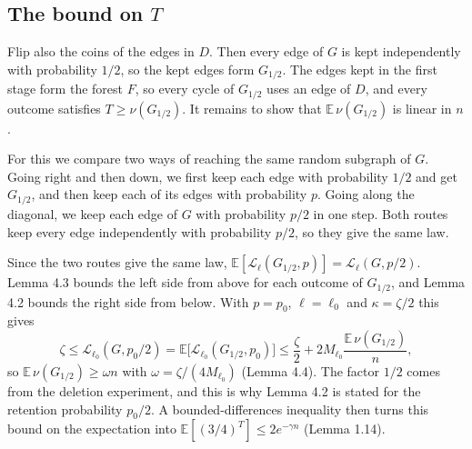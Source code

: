﻿\documentclass[10pt,a4paper]{article}
\newcommand{\E}{\mathbb{E}}
\newcommand{\Lp}{\mathcal{L}}
\newcommand{\Hyp}{\textup{(H)}}
\begin{document}
\subsection{The bound on \(T\)}

Flip also the coins of the edges in \(D\). Then every edge of \(G\) is kept
independently with probability \(1/2\), so the kept edges form \(G_{1/2}\).
The edges kept in the first stage form the forest \(F\), so every cycle of
\(G_{1/2}\) uses an edge of \(D\), and every outcome satisfies
\(T\ge\nu(G_{1/2})\). It remains to show that \(\E\,\nu(G_{1/2})\) is linear
in \(n\).

For this we compare two ways of reaching the same random subgraph of \(G\).
Going right and then down, we first keep each edge with probability \(1/2\)
and get \(G_{1/2}\), and then keep each of its edges with probability \(p\).
Going along the diagonal, we keep each edge of \(G\) with probability \(p/2\)
in one step. Both routes keep every edge independently with probability
\(p/2\), so they give the same law.

\begin{center}
\end{center}

Since the two routes give the same law,
\(\E[\Lp_\ell(G_{1/2},p)]=\Lp_\ell(G,p/2)\). Lemma 4.3 bounds the left side
from above for each outcome of \(G_{1/2}\), and Lemma 4.2 bounds the right side
from below. With \(p=p_0\), \(\ell=\ell_0\) and \(\kappa=\zeta/2\) this gives
\[
  \zeta
  \le\Lp_{\ell_0}(G,p_0/2)
  =\E\bigl[\Lp_{\ell_0}(G_{1/2},p_0)\bigr]
  \le\frac\zeta2+2M_{\ell_0}\frac{\E\,\nu(G_{1/2})}{n},
\]
so \(\E\,\nu(G_{1/2})\ge\omega n\) with \(\omega=\zeta/(4M_{\ell_0})\)
(Lemma 4.4). The factor \(1/2\) comes from the deletion experiment, and this is
why Lemma 4.2 is stated for the retention probability \(p_0/2\). A
bounded-differences inequality then turns this bound on the expectation into
\(\E[(3/4)^T]\le2e^{-\gamma n}\) (Lemma 1.14).
\end{document}
